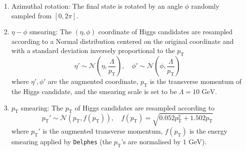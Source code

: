 \documentclass[12pt]{article}
\begin{document}
        \begin{enumerate}
            \item Azimuthal rotation: The final state is rotated by an angle $\phi$ randomly sampled from $[0, 2\pi]$.
            \item $\eta-\phi$ smearing: The $\left( \eta,\phi \right) $ coordinate of Higgs candidates are resampled according to a Normal distribution centered on the original coordinate and with a standard deviation inversely proportional to the $p_{\text{T}}$
                \begin{equation}
                    \eta' \sim \mathcal{N}\left(\eta, \frac{\Lambda}{p_{\text{T}}}\right), \quad \phi' \sim \mathcal{N}\left(\phi, \frac{\Lambda}{p_{\text{T}}}\right)
                \end{equation}
                where $\eta', \phi'$ are the augmented coordinate, $p_{\text{T}}$ is the transverse momentum of the Higgs candidate, and the smearing scale is set to be $\Lambda = \text{10 GeV}$.
            \item $p_\text{T}$ smearing: The $p_{\text{T}}$ of Higgs candidates are resampled according to
                \begin{equation}
                    p_{\text{T}}' \sim \mathcal{N}\left( p_{\text{T}}, f(p_{\text{T}}) \right), \quad f(p_{\text{T}}) = \sqrt{0.052 p_{\text{T}}^2 + 1.502p_{\text{T}}}
                \end{equation}
                where $p_{\text{T}}'$ is the augmented transverse momentum, $f\left( p_\text{T} \right) $ is the energy smearing applied by \verb|Delphes| (the $p_{\text{T}}$'s are normalised by $\text{1 GeV}$).
        \end{enumerate}
\end{document}
